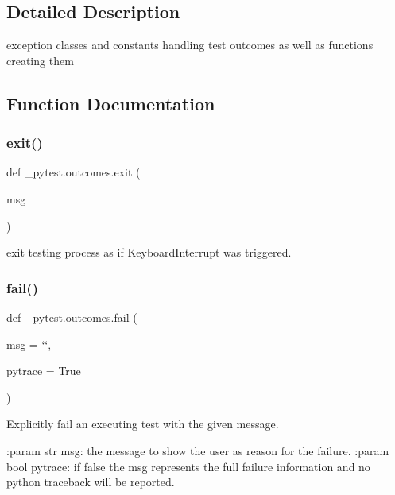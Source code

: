 \subsection{Detailed Description}
\begin{DoxyVerb}exception classes and constants handling test outcomes
as well as functions creating them
\end{DoxyVerb}
 

\subsection{Function Documentation}
\mbox{\label{namespace__pytest_1_1outcomes_a80a3d7119b0e373d1a2b53ebf248a094}} 
\subsubsection{\texorpdfstring{exit()}{exit()}}
{\footnotesize\ttfamily def \+\_\+pytest.\+outcomes.\+exit (\begin{DoxyParamCaption}\item[{}]{msg }\end{DoxyParamCaption})}

\begin{DoxyVerb}exit testing process as if KeyboardInterrupt was triggered. \end{DoxyVerb}
 \mbox{\label{namespace__pytest_1_1outcomes_aea7cd78ad2dc857366fae4d25d05f02b}} 
\subsubsection{\texorpdfstring{fail()}{fail()}}
{\footnotesize\ttfamily def \+\_\+pytest.\+outcomes.\+fail (\begin{DoxyParamCaption}\item[{}]{msg = {\ttfamily \char`\"{}\char`\"{}},  }\item[{}]{pytrace = {\ttfamily True} }\end{DoxyParamCaption})}

\begin{DoxyVerb}Explicitly fail an executing test with the given message.

:param str msg: the message to show the user as reason for the failure.
:param bool pytrace: if false the msg represents the full failure information and no
    python traceback will be reported.
\end{DoxyVerb}
 \mbox{\label{namespace__pytest_1_1outcomes_ad806324628e36473b1c76d4cb1948fc8}} 
